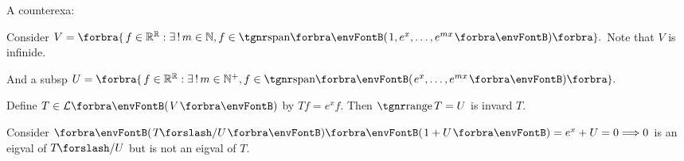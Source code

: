 A counterexa:\par\quad
Consider $V=\Bra{\,f\in\Rbb^{\Rbb}:\exists\,!\,m\in\Nbb,f\in\Span{1,e^x,\dots,e^{mx}}}.$ Note that $V$ is infinide.\par\quad
And a subsp $U=\Bra{\,f\in\Rbb^{\Rbb}:\exists\,!\,m\in\Nbp,f\in\Span{e^x,\dots,e^{mx}}}.$\par\quad
Define $T\in\Lm{V}$ by $Tf=e^x f.$ Then $\range T=U$ is invard $T.$\par\quad
Consider $\Par{T\XSlash U}\Par{1+U}=e^x+U=0\Longrightarrow 0$ is an eigval of $T\XSlash U$ but is not an eigval of $T$.\par\quad
{}\PfEnd
\SepLine

